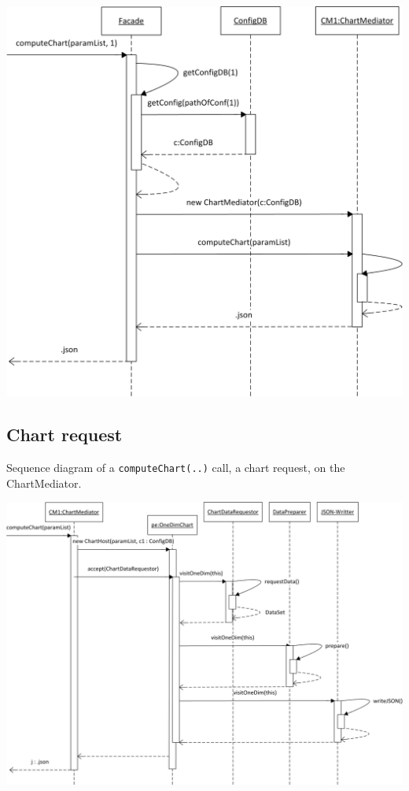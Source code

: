 \begin{center}
\includegraphics{Pictures/Seq/SeqFacade.png}  
\end{center} 
 


\newpage
\subsection{Chart request}
Sequence diagram of a \texttt{computeChart(..)} call, a chart request, on the ChartMediator.
 
\begin{center}
\includegraphics[width=1\linewidth]{Pictures/Seq/SeqChart.png}  
\end{center}
 
